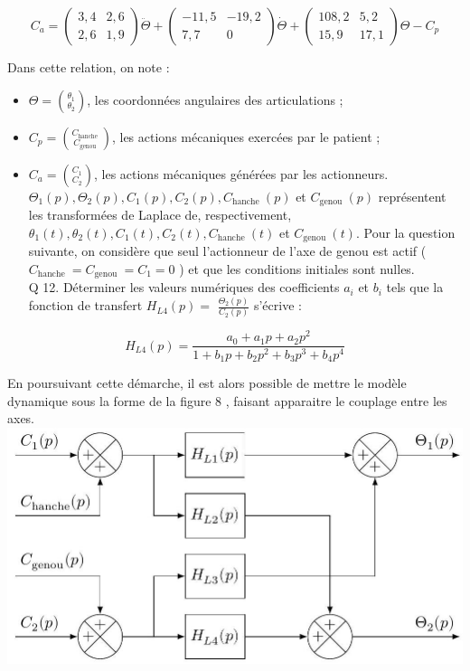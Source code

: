 \documentclass[10pt]{article}
\begin{document}
$$
C_{a}=\left(\begin{array}{cc}
3,4 & 2,6 \\
2,6 & 1,9
\end{array}\right) \ddot{\Theta}+\left(\begin{array}{cc}
-11,5 & -19,2 \\
7,7 & 0
\end{array}\right) \dot{\Theta}+\left(\begin{array}{cc}
108,2 & 5,2 \\
15,9 & 17,1
\end{array}\right) \Theta-C_{p}
$$

Dans cette relation, on note :

\begin{itemize}
  \item $\Theta=\binom{\theta_{1}}{\theta_{2}}$, les coordonnées angulaires des articulations ;
  \item $C_{p}=\binom{C_{\text {hanche }}}{C_{\text {genou }}}$, les actions mécaniques exercées par le patient ;
  \item $C_{a}=\binom{C_{1}}{C_{2}}$, les actions mécaniques générées par les actionneurs.\\
$\Theta_{1}(p), \Theta_{2}(p), C_{1}(p), C_{2}(p), C_{\text {hanche }}(p)$ et $C_{\text {genou }}(p)$ représentent les transformées de Laplace de, respectivement, $\theta_{1}(t), \theta_{2}(t), C_{1}(t), C_{2}(t), C_{\text {hanche }}(t)$ et $C_{\text {genou }}(t)$. Pour la question suivante, on considère que seul l'actionneur de l'axe de genou est actif ( $C_{\text {hanche }}=C_{\text {genou }}=C_{1}=0$ ) et que les conditions initiales sont nulles.\\
Q 12. Déterminer les valeurs numériques des coefficients $a_{i}$ et $b_{i}$ tels que la fonction de transfert $H_{L 4}(p)=$ $\frac{\Theta_{2}(p)}{C_{2}(p)}$ s'écrive :
\end{itemize}

$$
H_{L 4}(p)=\frac{a_{0}+a_{1} p+a_{2} p^{2}}{1+b_{1} p+b_{2} p^{2}+b_{3} p^{3}+b_{4} p^{4}}
$$

En poursuivant cette démarche, il est alors possible de mettre le modèle dynamique sous la forme de la figure 8 , faisant apparaitre le couplage entre les axes.\\
\includegraphics[max width=\textwidth, center]{2025_07_03_97545f5dc188959e5663g-06}
\end{document}
